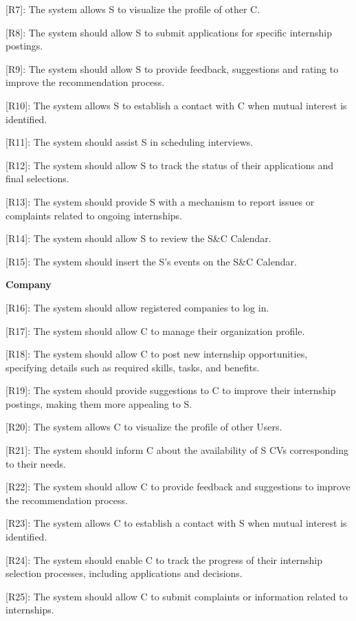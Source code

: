 {[}R7{]}: The system allows S to visualize the profile of other C.

{[}R8{]}: The system should allow S to submit applications for specific
internship postings.

{[}R9{]}: The system should allow S to provide feedback, suggestions and
rating to improve the recommendation process.

{[}R10{]}: The system allows S to establish a contact with C when mutual
interest is identified.

{[}R11{]}: The system should assist S in scheduling interviews.

{[}R12{]}: The system should allow S to track the status of their
applications and final selections.

{[}R13{]}: The system should provide S with a mechanism to report issues
or complaints related to ongoing internships.

{[}R14{]}: The system should allow S to review the S\&C Calendar.

{[}R15{]}: The system should insert the S's events on the S\&C Calendar.

\textbf{Company}

{[}R16{]}: The system should allow registered companies to log in.

{[}R17{]}: The system should allow C to manage their organization
profile.

{[}R18{]}: The system should allow C to post new internship
opportunities, specifying details such as required skills, tasks, and
benefits.

{[}R19{]}: The system should provide suggestions to C to improve their
internship postings, making them more appealing to S.

{[}R20{]}: The system allows C to visualize the profile of other Users.

{[}R21{]}: The system should inform C about the availability of S CVs
corresponding to their needs.

{[}R22{]}: The system should allow C to provide feedback and suggestions
to improve the recommendation process.

{[}R23{]}: The system allows C to establish a contact with S when mutual
interest is identified.

{[}R24{]}: The system should enable C to track the progress of their
internship selection processes, including applications and decisions.

{[}R25{]}: The system should allow C to submit complaints or information
related to internships.

